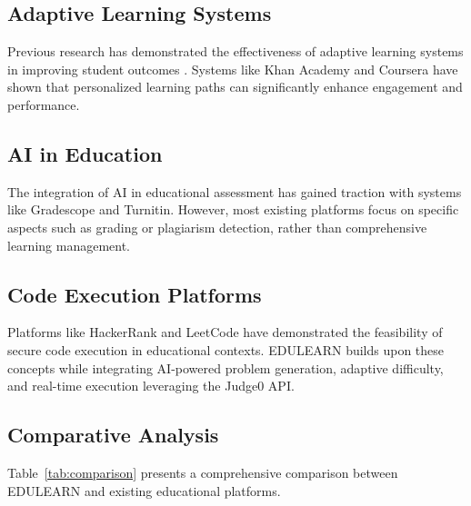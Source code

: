\documentclass[conference]{IEEEtran}
\begin{document}
\subsection{Adaptive Learning Systems}
Previous research has demonstrated the effectiveness of adaptive learning systems in improving student outcomes \cite{adaptive1}. Systems like Khan Academy and Coursera have shown that personalized learning paths can significantly enhance engagement and performance.

\subsection{AI in Education}
The integration of AI in educational assessment has gained traction with systems like Gradescope and Turnitin. However, most existing platforms focus on specific aspects such as grading or plagiarism detection, rather than comprehensive learning management.

\subsection{Code Execution Platforms}
Platforms like HackerRank and LeetCode have demonstrated the feasibility of secure code execution in educational contexts. EDULEARN builds upon these concepts while integrating AI-powered problem generation, adaptive difficulty, and real-time execution leveraging the Judge0 API.

\subsection{Comparative Analysis}
Table~\ref{tab:comparison} presents a comprehensive comparison between EDULEARN and existing educational platforms.
\end{document}
